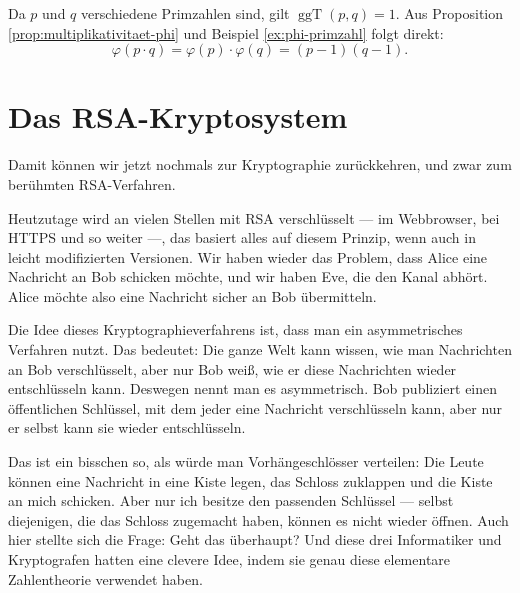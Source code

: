 \begin{math-stroke}
\begin{short-proof}
Da $p$ und $q$ verschiedene Primzahlen sind, gilt $\operatorname{ggT}(p, q) = 1$. Aus Proposition \ref{prop:multiplikativitaet-phi} und Beispiel \ref{ex:phi-primzahl} folgt direkt:
\[
\varphi(p \cdot q) = \varphi(p) \cdot \varphi(q) = (p - 1)(q - 1).
\]
\end{short-proof}
\end{math-stroke}

\section{Das RSA-Kryptosystem}

\begin{spoken-clean}[01:23:02 - 01:24:42]
Damit können wir jetzt nochmals zur Kryptographie zurückkehren, und zwar zum berühmten RSA-Verfahren. 

Heutzutage wird an vielen Stellen mit RSA verschlüsselt --- im Webbrowser, bei HTTPS und so weiter ---, das basiert alles auf diesem Prinzip, wenn auch in leicht modifizierten Versionen. Wir haben wieder das Problem, dass Alice eine Nachricht an Bob schicken möchte, und wir haben Eve, die den Kanal abhört. Alice möchte also eine Nachricht sicher an Bob übermitteln.

Die Idee dieses Kryptographieverfahrens ist, dass man ein asymmetrisches Verfahren nutzt. Das bedeutet: Die ganze Welt kann wissen, wie man Nachrichten an Bob verschlüsselt, aber nur Bob weiß, wie er diese Nachrichten wieder entschlüsseln kann. Deswegen nennt man es asymmetrisch. Bob publiziert einen öffentlichen Schlüssel, mit dem jeder eine Nachricht verschlüsseln kann, aber nur er selbst kann sie wieder entschlüsseln.

Das ist ein bisschen so, als würde man Vorhängeschlösser verteilen: Die Leute können eine Nachricht in eine Kiste legen, das Schloss zuklappen und die Kiste an mich schicken. Aber nur ich besitze den passenden Schlüssel --- selbst diejenigen, die das Schloss zugemacht haben, können es nicht wieder öffnen. Auch hier stellte sich die Frage: Geht das überhaupt? Und diese drei Informatiker und Kryptografen hatten eine clevere Idee, indem sie genau diese elementare Zahlentheorie verwendet haben.
\end{spoken-clean}

